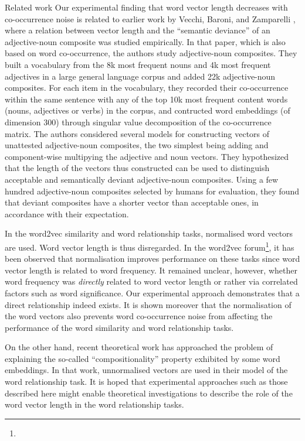 \documentclass{article} %
\begin{document}
\begin{section}{Related work}
Our experimental finding that word vector length decreases with
co-occurrence noise is related to earlier work by Vecchi, Baroni, and
Zamparelli \cite{vecchi-baroni-zamparelli2011}, where a relation between
vector length and the ``semantic deviance'' of an adjective-noun
composite was studied empirically.  In that paper, which is also based
on word co-occurrence, the authors study adjective-noun composites.
They built a vocabulary from the 8k most frequent nouns and 4k most
frequent adjectives in a large general language corpus and added 22k
adjective-noun composites.  For each item in the vocabulary, they
recorded their co-occurrence within the same sentence with any of the
top 10k most frequent content words (nouns, adjectives or verbs) in the
corpus, and contructed word embeddings (of dimension 300) through
singular value decomposition of the co-occurrence matrix.  The authors considered several models for
constructing vectors of unattested adjective-noun composites, the two
simplest being adding and component-wise multipying the adjective and
noun vectors.  They hypothesized that the length of the vectors thus
constructed can be used to distinguish acceptable and semantically
deviant adjective-noun composites.  Using a few hundred adjective-noun
composites selected by humans for evaluation, they found that deviant
composites have a shorter vector than acceptable ones, in accordance
with their expectation.

In the word2vec similarity and word relationship tasks, normalised word vectors are used.
Word vector length is thus disregarded.
In the word2vec forum\footnote{\googlegroup}, it has been observed that normalisation improves performance on these tasks since word vector length is related to word frequency.
It remained unclear, however, whether word frequency was \textit{directly} related to word vector length or rather via correlated factors such as word significance.
Our experimental approach demonstrates that a direct relationship indeed exists.
It is shown moreover that the normalisation of the word vectors also prevents word co-occurrence noise from affecting the performance of the word similarity and word relationship tasks.

On the other hand, recent theoretical work \cite{Arora2015} has approached the problem of explaining the so-called ``compositionality'' property exhibited by some word embeddings.
In that work, unnormalised vectors are used in their model of the word relationship task.
It is hoped that experimental approaches such as those described here might enable theoretical investigations to describe the role of the word vector length in the word relationship tasks.
\end{section}
\end{document}
